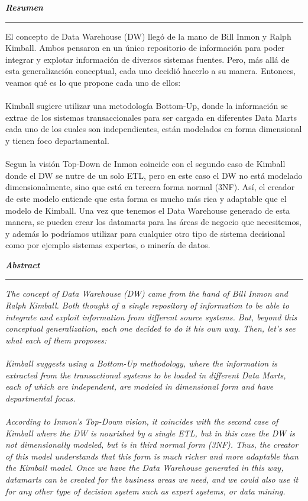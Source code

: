 \documentclass[11pt,a4paper]{article}
\begin{document}
		\textbf{\textit{\large Resumen}}\rule[1.5mm]{5mm}{0.1mm}		
		El concepto de Data Warehouse (DW) llegó de la mano de Bill Inmon y Ralph Kimball. Ambos pensaron en un único repositorio de información para poder integrar y explotar información de diversos sistemas fuentes. Pero, más allá de esta generalización conceptual, cada uno decidió hacerlo a su manera. Entonces, veamos qué es lo que propone cada uno de ellos:\\
		\\
		Kimball sugiere utilizar una metodología Bottom-Up, donde la información se extrae de los sistemas transaccionales para ser cargada en diferentes Data Marts cada uno de los cuales son independientes, están modelados en forma dimensional y tienen foco departamental.\\
		\\
		Segun la visión Top-Down de Inmon coincide con el segundo caso de Kimball donde el DW se nutre de un solo ETL, pero en este caso el DW no está modelado dimensionalmente, sino que está en tercera forma normal (3NF). Así, el creador de este modelo entiende que esta forma es mucho más rica y adaptable que el modelo de Kimball. Una vez que tenemos el Data Warehouse generado de esta manera, se pueden crear los datamarts para las áreas de negocio que necesitemos, y además lo podríamos utilizar para cualquier otro tipo de sistema decisional como por ejemplo sistemas expertos, o minería de datos.\\
		
		
		\newpage
		
		\textbf{\textit{\large Abstract}}\rule[1.5mm]{5mm}{0.1mm} 		
		\textit{
			The concept of Data Warehouse (DW) came from the hand of Bill Inmon and Ralph Kimball. Both thought of a single repository of information to be able to integrate and exploit information from different source systems. But, beyond this conceptual generalization, each one decided to do it his own way. Then, let's see what each of them proposes: \\
			\\
			Kimball suggests using a Bottom-Up methodology, where the information is extracted from the transactional systems to be loaded in different Data Marts, each of which are independent, are modeled in dimensional form and have departmental focus. \\
			\\
			According to Inmon's Top-Down vision, it coincides with the second case of Kimball where the DW is nourished by a single ETL, but in this case the DW is not dimensionally modeled, but is in third normal form (3NF). Thus, the creator of this model understands that this form is much richer and more adaptable than the Kimball model. Once we have the Data Warehouse generated in this way, datamarts can be created for the business areas we need, and we could also use it for any other type of decision system such as expert systems, or data mining.
		 }
				
\end{document}
